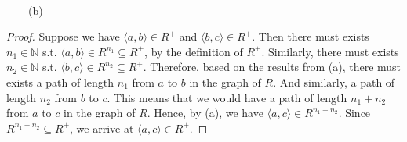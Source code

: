 \documentclass[12pt]{article}
\begin{document}
~~~
\begin{center}
    ------(b)------
\end{center}
\begin{proof}
    Suppose we have $\langle a,b \rangle \in R^+$ and $\langle b,c \rangle \in R^+$. 
    Then there must exists $n_1 \in \mathbb{N}$ s.t. $\langle a, b \rangle \in R^{n_1} \subseteq R^+$, by the definition of $R^+$.
    Similarly, there must exists $n_2 \in \mathbb{N}$ s.t. $\langle b, c \rangle \in R^{n_2} \subseteq R^+$.
    Therefore, based on the results from (a), there must exists a path of length $n_1$ from $a$ to $b$ in the graph of $R$.
    And similarly, a path of length $n_2$ from $b$ to $c$. 
    This means that we would have a path of length $n_1 + n_2$ from $a$ to $c$ in the graph of $R$.
    Hence, by (a), we have $\langle a, c \rangle \in R^{n_1 + n_2}$. 
    Since $R^{n_1 + n_2} \subseteq R^+$, we arrive at $\langle a, c \rangle \in R^+$.
\end{proof}
\end{document}
